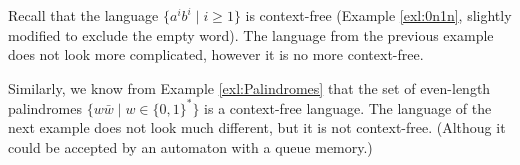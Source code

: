 

\setcounter{section}{7}
\setcounter{subsection}{2}
\setcounter{dfn}{4}


Recall that the language $\{a^ib^i \mid i \ge 1\}$ is context-free (Example \ref{exl:0n1n}, slightly modified to exclude the empty word).
The language from the previous example does not look more complicated, however it is no more context-free.

Similarly, we know from Example \ref{exl:Palindromes} that the set of even-length palindromes $\{w \bar{w} \mid w \in \{0,1\}^*\}$
is a context-free language.
The language of the next example does not look much different, but it is not context-free.
(Althoug it could be accepted by an automaton with a queue memory.)



